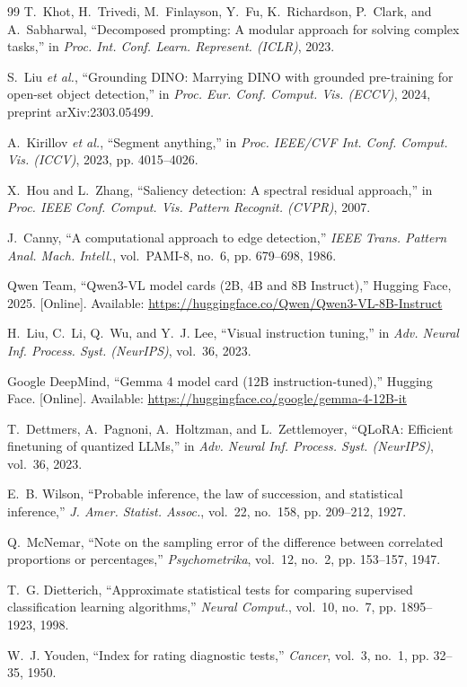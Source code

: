 \documentclass[conference]{IEEEtran}
\begin{document}
\begin{thebibliography}{99}
T.~Khot, H.~Trivedi, M.~Finlayson, Y.~Fu, K.~Richardson, P.~Clark, and A.~Sabharwal, ``Decomposed
prompting: A modular approach for solving complex tasks,'' in \emph{Proc. Int. Conf. Learn. Represent.
(ICLR)}, 2023.

S.~Liu \emph{et al.}, ``Grounding {DINO}: Marrying {DINO} with grounded pre-training for open-set
object detection,'' in \emph{Proc. Eur. Conf. Comput. Vis. (ECCV)}, 2024, preprint arXiv:2303.05499.

A.~Kirillov \emph{et al.}, ``Segment anything,'' in \emph{Proc. IEEE/CVF Int. Conf. Comput. Vis.
(ICCV)}, 2023, pp. 4015--4026.

X.~Hou and L.~Zhang, ``Saliency detection: A spectral residual approach,'' in \emph{Proc. IEEE Conf.
Comput. Vis. Pattern Recognit. (CVPR)}, 2007.

J.~Canny, ``A computational approach to edge detection,'' \emph{IEEE Trans. Pattern Anal. Mach.
Intell.}, vol.~PAMI-8, no.~6, pp. 679--698, 1986.

Qwen Team, ``{Qwen3-VL} model cards (2B, 4B and 8B Instruct),'' Hugging Face, 2025. [Online]. Available:
\url{https://huggingface.co/Qwen/Qwen3-VL-8B-Instruct}

H.~Liu, C.~Li, Q.~Wu, and Y.~J. Lee, ``Visual instruction tuning,'' in \emph{Adv. Neural Inf.
Process. Syst. (NeurIPS)}, vol.~36, 2023.

Google DeepMind, ``Gemma 4 model card (12B instruction-tuned),'' Hugging Face. [Online]. Available:
\url{https://huggingface.co/google/gemma-4-12B-it}

T.~Dettmers, A.~Pagnoni, A.~Holtzman, and L.~Zettlemoyer, ``{QLoRA}: Efficient finetuning of
quantized {LLMs},'' in \emph{Adv. Neural Inf. Process. Syst. (NeurIPS)}, vol.~36, 2023.

E.~B. Wilson, ``Probable inference, the law of succession, and statistical inference,'' \emph{J. Amer.
Statist. Assoc.}, vol.~22, no.~158, pp. 209--212, 1927.

Q.~McNemar, ``Note on the sampling error of the difference between correlated proportions or
percentages,'' \emph{Psychometrika}, vol.~12, no.~2, pp. 153--157, 1947.

T.~G. Dietterich, ``Approximate statistical tests for comparing supervised classification learning
algorithms,'' \emph{Neural Comput.}, vol.~10, no.~7, pp. 1895--1923, 1998.

W.~J. Youden, ``Index for rating diagnostic tests,'' \emph{Cancer}, vol.~3, no.~1, pp. 32--35, 1950.

\end{thebibliography}
\end{document}
